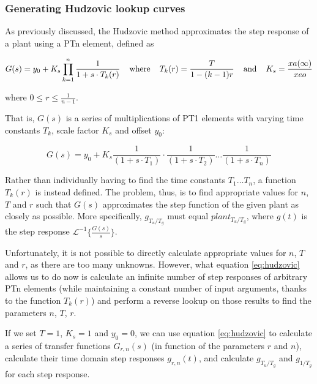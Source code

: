 \subsubsection{Generating Hudzovic lookup curves}

As previously discussed, the Hudzovic method approximates the step response of a
plant using a PTn element, defined as

\begin{equation}
    G(s) = y_0 + K_s \prod_{k=1}^{n} \frac{1}{1+s \cdot T_k(r)} \textrm{\hspace{4mm}where\hspace{4mm}} T_k(r) = \frac{T}{1 - (k-1)r} \textrm{\hspace{4mm}and\hspace{4mm}} K_s = \frac{xa(\infty)}{xeo}
    \label{eq:hudzovic}
\end{equation}

where $0 \le r \leq \frac{1}{n-1}$.

That is, $G(s)$ is a series of multiplications of PT1 elements with varying time
constants $T_k$, scale factor $K_s$ and offset $y_0$:

\begin{equation}
    G(s) = y_0 + K_s \frac{1}{\left(1+s\cdot T_1\right)}\cdot\frac{1}{\left(1+s\cdot T_2\right)}\ldots\frac{1}{\left(1+s\cdot T_n\right)}
\end{equation}

Rather  than individually having to find the time constants $T_1\ldots  T_n$,  a
function $T_k(r)$ is instead  defined. The problem, thus, is to find appropriate
values for $n$, $T$ and  $r$  such that $G(s)$ approximates the step function of
the  given  plant as closely as possible. More specifically, $g_{T_u/T_g}$  must
equal    $plant_{T_u/T_g}$,    where     $g(t)$    is    the    step    response
$\mathscr{L}^{-1}\{\frac{G(s)}{s}\}$.

Unfortunately,  it  is not possible to directly calculate appropriate values for
$n$,  $T$  and  $r$,  as there are too many  unknowns.  However,  what  equation
\ref{eq:hudzovic} allows us to do now  is  calculate  an infinite number of step
responses  of  arbitrary  PTn  elements (while maintaining a constant number  of
input  arguments,  thanks to the function $T_k(r)$) and perform a reverse lookup
on those results to find the parameters $n$, $T$, $r$.

If we set $T=1$, $K_s=1$  and  $y_0=0$, we can use equation \ref{eq:hudzovic} to
calculate  a  series  of  transfer functions $G_{r,n}(s)$ (in  function  of  the
parameters   $r$  and  $n$),  calculate  their  time   domain   step   responses
$g_{r,n}(t)$,  and  calculate  $g_{T_u/T_g}$  and  $g_{1/T_g}$   for  each  step
response.

